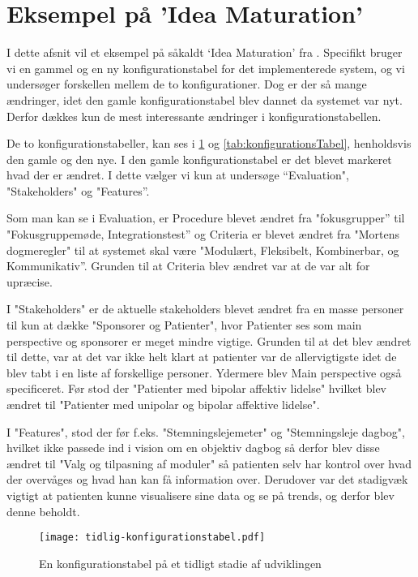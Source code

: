 \section{Eksempel på 'Idea Maturation'}
I dette afsnit vil et eksempel på såkaldt `Idea Maturation' fra \citet[Kapitel 23]{art:essence}.
Specifikt bruger vi en gammel og en ny konfigurationstabel for det implementerede system, og vi undersøger forskellen mellem de to konfigurationer.
Dog er der så mange ændringer, idet den gamle konfigurationstabel blev dannet da systemet var nyt. 
Derfor dækkes kun de mest interessante ændringer i konfigurationstabellen.

De to konfigurationstabeller, kan ses i \cref{tab:tidligKonfigurationsTabel} og \cref{tab:konfigurationsTabel}, henholdsvis den gamle og den nye. 
I den gamle konfigurationstabel er det blevet markeret hvad der er ændret.
I dette vælger vi kun at undersøge ``Evaluation", "Stakeholders" og "Features''. 

Som man kan se i Evaluation, er Procedure blevet ændret fra "fokusgrupper'' til "Fokusgruppemøde, Integrationstest'' og Criteria er blevet ændret fra "Mortens dogmeregler" til at systemet skal være "Modulært, Fleksibelt, Kombinerbar, og Kommunikativ''. Grunden til at Criteria blev ændret var at de var alt for upræcise.

I "Stakeholders" er de aktuelle stakeholders blevet ændret fra en masse personer til kun at dække "Sponsorer og Patienter", hvor Patienter ses som main perspective og sponsorer er meget mindre vigtige. 
Grunden til at det blev ændret til dette, var at det var ikke helt klart at patienter var de allervigtigste idet de blev tabt i en liste af forskellige personer.
Ydermere blev Main perspective også specificeret.
Før stod der "Patienter med bipolar affektiv lidelse" hvilket blev ændret til "Patienter med unipolar og bipolar affektive lidelse". 

I "Features", stod der før f.eks. "Stemningslejemeter" og "Stemningsleje dagbog", hvilket ikke passede ind i vision om en objektiv dagbog så derfor blev disse ændret til "Valg og tilpasning af moduler" så patienten selv har kontrol over hvad der overvåges og hvad han kan få information over. Derudover var det stadigvæk vigtigt at patienten kunne visualisere sine data og se på trends, og derfor blev denne beholdt. 

\begin{figure}
	\texttt{[image: tidlig-konfigurationstabel.pdf]}
	\caption{En konfigurationstabel på et tidligt stadie af udviklingen}
	\label{tab:tidligKonfigurationsTabel}
\end{figure}